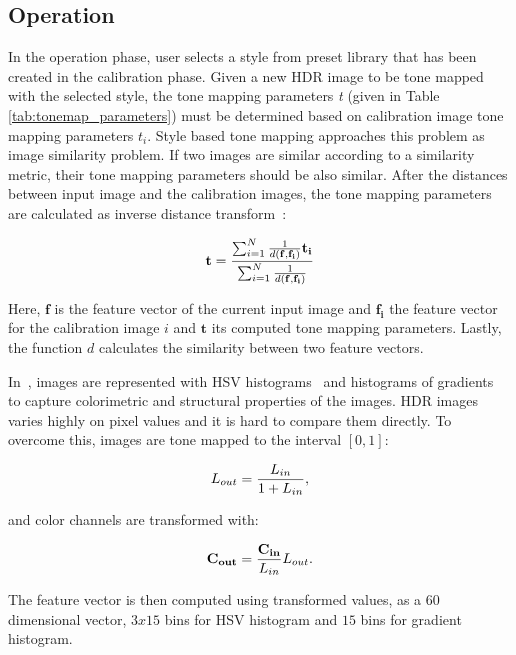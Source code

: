 \subsection{Operation}
\label{sec:operation}
In the operation phase, user selects a style from preset library that has been created in the calibration phase. Given a new HDR image to be tone mapped with the selected style, the tone mapping parameters \emph{t} (given in Table \ref{tab:tonemap_parameters}) must be determined based on calibration image tone mapping parameters \emph{$t_i$}. Style based tone mapping approaches this problem as image similarity problem. If two images are similar according to a similarity metric, their tone mapping parameters should be also similar. After the distances between input image and the calibration images, the tone mapping parameters are calculated as inverse distance transform~\cite{Shepard1968}:

\begin{equation}
\label{eq:inv_distance_transform}
    \mathbf{t} = {{\sum _{i=1} ^{N} {1 \over {d(\mathbf{f}, \mathbf{f_i})}} \mathbf{t_i}} \over {\sum _{i=1} ^{N} {1 \over {d(\mathbf{f}, \mathbf{f_i})}}}}
\end{equation}

Here, $\mathbf{f}$ is the feature vector of the current input image and $\mathbf{f_i}$ the feature vector for the calibration image $i$ and $\mathbf{t}$ its computed tone mapping parameters. Lastly, the function $d$ calculates the similarity between two feature vectors.

In~\cite{akyuz2013style}, images are represented with HSV histograms~\cite{Ben2006} and histograms of gradients~\cite{dalal2005histograms} to capture colorimetric and structural properties of the images. HDR images varies highly on pixel values and it is hard to compare them directly. To overcome this, images are tone mapped to the interval $[0,1]$:

\begin{equation}
    L_{out} = {{L_{in}} \over {1 + L_{in}}}, 
\end{equation}

and color channels are transformed with:

\begin{equation}
    \mathbf{C_{out}} = {{\mathbf{C_{in}}}\over{L_{in}}} L_{out}.
\end{equation}

The feature vector is then computed using transformed values, as a $60$ dimensional vector, $3x15$ bins for HSV histogram and $15$ bins for gradient histogram. 


